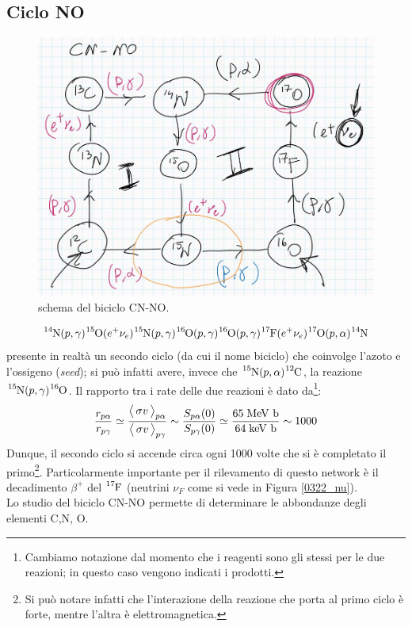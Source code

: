 \subsection{Ciclo NO}
\begin{figure}[!h]
	\centering
	\includegraphics[scale=0.5]{Immagini/0422_biCNNOscheme.png}
	\caption{schema del biciclo CN-NO.}
	\label{0422_NO}
\end{figure}
$$\ce{^{14}N}(p,\gamma)\ce{^{15}O}(e^+\nu_e)\ce{^{15}N}(p,\gamma)\ce{^{16}O}(p,\gamma)\ce{^{16}O}(p,\gamma)\ce{^{17}F}(e^+\nu_e)\ce{^{17}O}(p,\alpha)\ce{^{14}N}$$
 presente in realtà un secondo ciclo (da cui il nome biciclo) che coinvolge l'azoto e l'ossigeno (\textit{seed}); si può infatti avere, invece che $\ce{^{15}N}(p,\alpha)\ce{^{12}C}$, la reazione $\ce{^{15}N}(p,\gamma)\ce{^{16}O}$. Il rapporto tra i rate delle due reazioni è dato da\footnote{Cambiamo notazione dal momento che i reagenti sono gli stessi per le due reazioni; in questo caso vengono indicati i prodotti.}:
$$\frac{r_{p\alpha}}{r_{p\gamma}}\simeq \frac{\bigl\langle\, \sigma v\, \bigr\rangle_{p\alpha}}{\bigl\langle\, \sigma v\, \bigr\rangle_{p\gamma}}\sim\frac{S_{p\alpha}(0)}{S_{p\gamma}(0)}\simeq \frac{65\;\mbox{MeV b}}{64\;\mbox{keV b}}\sim 1000$$
Dunque, il secondo ciclo si accende circa ogni 1000 volte che si è completato il primo\footnote{Si può notare infatti che l'interazione della reazione che porta al primo ciclo è forte, mentre l'altra è elettromagnetica.}. Particolarmente importante per il rilevamento di questo network è il decadimento $\beta^+$ del $\ce{^{17}F}$ (neutrini $\nu_F$ come si vede in Figura \ref{0322_nu}).\\ 
Lo studio del biciclo CN-NO permette di determinare le abbondanze degli elementi C,N, O. 


